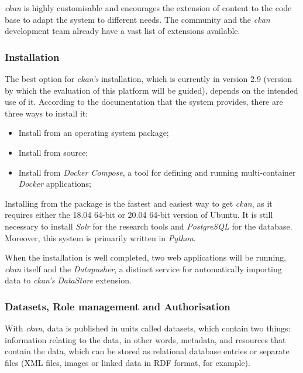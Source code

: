 \textit{\gls{ckan}} is highly customisable and encourages the extension of content to the code base to adapt the system to different needs. The community and the \textit{\gls{ckan}} development team already have a vast list of extensions available.
  
\subsubsection{Installation}
  
The best option for \textit{\gls{ckan}'s} installation, which is currently in version 2.9 (version by which the evaluation of this platform will be guided), depends on the intended use of it. According to the documentation that the system provides, there are three ways to install it: 
  
\begin{itemize}
  \item Install from an operating system package;
  \item Install from source;
  \item Install from \textit{Docker Compose}, a tool for defining and running multi-container \textit{Docker} applications;
\end{itemize}
  
Installing from the package is the fastest and easiest way to get \textit{\gls{ckan}}, as it requires either the 18.04 64-bit or 20.04 64-bit version of Ubuntu. It is still necessary to install \textit{Solr} for the research tools and \textit{PostgreSQL} for the database. Moreover, this system is primarily written in \textit{Python}.
  
When the installation is well completed, two web applications will be running, \textit{\gls{ckan}} itself and the \textit{Datapusher}, a distinct service for automatically importing data to \textit{\gls{ckan}'s} \textit{DataStore} extension.
  
\subsubsection{Datasets, Role management and Authorisation}
  
With \textit{\gls{ckan}}, data is published in units called datasets, which contain two things: information relating to the data, in other words, metadata, and resources that contain the data, which can be stored as relational database entries or separate files (XML files, images or linked data in RDF format, for example).
  
